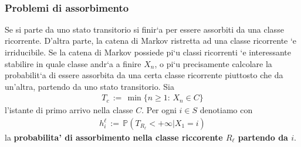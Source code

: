 \documentclass[a4paper,12pt]{article}
\begin{document}
\vspace{1px}\\
\subsubsection{Problemi di assorbimento}
Se si parte da uno stato transitorio si finir`a per essere assorbiti da una classe ricorrente.
D’altra parte, la catena di Markov ristretta ad una classe ricorrente `e irriducibile.
Se la catena di Markov possiede pi`u classi ricorrenti `e interessante stabilire in quale
classe andr`a a finire $X_n$, o pi`u precisamente calcolare la probabilit`a di essere assorbita da
una certa classe ricorrente piuttosto che da un’altra, partendo da uno stato transitorio.
Sia
\begin{align*}
  T_c \, := \, \min\{n \geq 1: \, X_n \in C\}
\end{align*}
l’istante di primo arrivo nella classe $C$. Per ogni $i \in S$ denotiamo con
\begin{align*}
  h_i^\ell \, := \, \mathbb{P}(T_{R_\ell} < + \infty | X_1 = i)
\end{align*}
la \textbf{probabilita' di assorbimento nella classe riccorente $R_\ell$ partendo da $i$}.\\
\vspace{1px}\\
\\
\vspace{1px}\\
\end{document}
